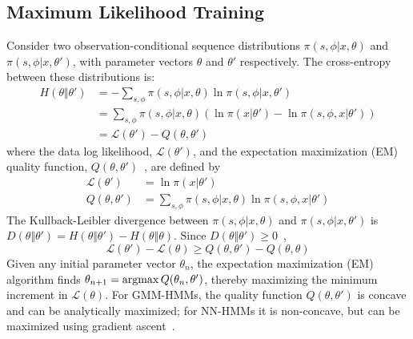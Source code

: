 \subsection{Maximum Likelihood Training}

Consider two observation-conditional sequence distributions
$\pi(s,\phi|x,\theta)$ and $\pi(s,\phi|x,\theta')$, with parameter
vectors $\theta$ and $\theta'$ respectively.  The cross-entropy
between these distributions is:
\begin{align}
  H\left(\theta\Vert\theta'\right) &=
  -\sum_{s,\phi} \pi(s,\phi|x,\theta)
  \ln \pi(s,\phi|x,\theta')\\
  &=   \sum_{s,\phi} \pi(s,\phi|x,\theta)
  \left(\ln \pi(x|\theta')-\ln \pi(s,\phi,x|\theta')\right)\\
  &=  {\mathcal L}\left(\theta'\right)-Q\left(\theta,\theta'\right)
  \label{eq:crossentropy}
\end{align}
where the data log likelihood, ${\mathcal L}\left(\theta'\right)$, and
the expectation maximization (EM) quality function,
$Q\left(\theta,\theta'\right)$~\cite{Dempster77}, are defined by
\begin{align}
  {\mathcal L}\left(\theta'\right) &= \ln \pi(x|\theta')
  \label{eq:loglikelihood}\\
  Q\left(\theta,\theta'\right)
  &=
  \sum_{s,\phi} \pi(s,\phi|x,\theta)\ln \pi(s,\phi,x|\theta')
   \label{eq:Qfunction}
\end{align}
The Kullback-Leibler divergence between $\pi(s,\phi|x,\theta)$ and
$\pi(s,\phi|x,\theta')$ is $D\left(\theta\Vert\theta'\right)=
H\left(\theta\Vert\theta'\right)-H\left(\theta\Vert\theta\right)$.
Since $D\left(\theta\Vert\theta'\right)\ge 0$~\cite{Shannon49},
\begin{equation}
  {\mathcal L}\left(\theta'\right)-{\mathcal L}\left(\theta\right)\ge
  Q\left(\theta,\theta'\right)-
  Q\left(\theta,\theta\right)
  \label{eq:LgeQ}
\end{equation}
Given any initial parameter vector $\theta_n$, the expectation
maximization (EM) algorithm finds $\theta_{n+1}=\operatorname*{argmax}
Q(\theta_n,\theta')$, thereby maximizing the minimum increment in
${\mathcal L}(\theta)$.  For GMM-HMMs, the quality function
$Q\left(\theta,\theta'\right)$ is concave and can be analytically
maximized; for NN-HMMs it is non-concave, but can be maximized using
gradient ascent~\cite{Bengio92}.

